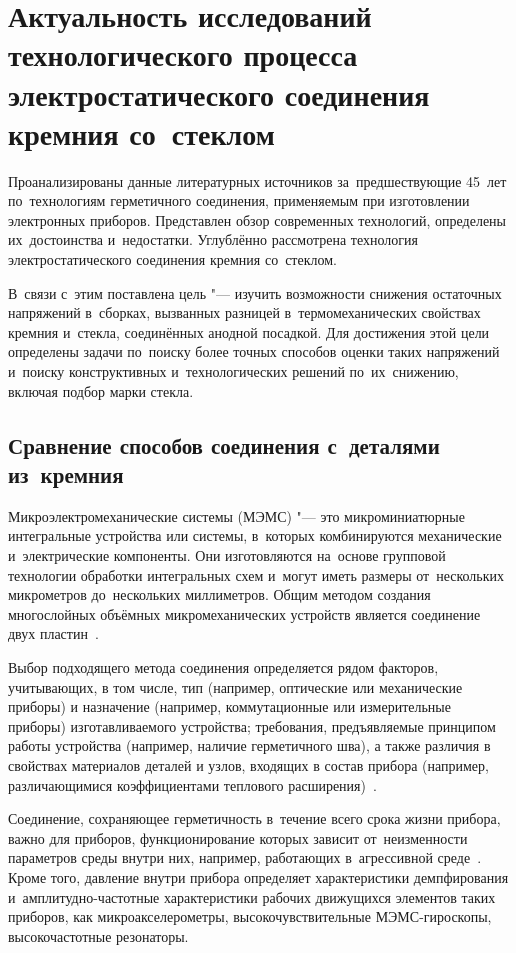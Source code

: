 \chapter{Актуальность исследований технологического процесса электростатического соединения кремния со~стеклом}

Проанализированы данные литературных источников за~предшествующие 45~лет по~технологиям герметичного соединения, применяемым при изготовлении электронных приборов.
Представлен обзор современных технологий, определены их~достоинства и~недостатки. Углублённо рассмотрена технология электростатического соединения кремния со~стеклом.

В~связи с~этим поставлена цель "--- изучить возможности снижения
остаточных напряжений в~сборках, вызванных разницей
в~термомеханических свойствах кремния и~стекла, соединённых анодной
посадкой.  Для достижения этой цели определены задачи по~поиску более
точных способов оценки таких напряжений и~поиску конструктивных
и~технологических решений по~их~снижению, включая подбор марки стекла.

\section{Сравнение способов соединения с~деталями из~кремния}

Микроэлектромеханические системы (МЭМС) "--- это микроминиатюрные интегральные устройства или системы, в~которых комбинируются механические и~электрические компоненты. Они изготовляются на~основе групповой технологии обработки интегральных схем и~могут иметь размеры от~нескольких микрометров до~нескольких миллиметров. Общим методом создания многослойных объёмных микромеханических устройств является соединение двух пластин~\cites[122]{Raspopov_micromechanics2007}.

Выбор подходящего метода соединения определяется рядом факторов, учитывающих, в том числе, тип (например, оптические или механические приборы) и назначение (например, коммутационные или измерительные приборы) изготавливаемого устройства; требования, предъявляемые принципом работы устройства (например, наличие герметичного шва), а также различия в свойствах материалов деталей и узлов, входящих в состав прибора (например, различающимися коэффициентами теплового расширения)~\cite{New_low_temperature_bonding_tech,Vacuum_Packaging_Technology_and_Appl}.

Соединение, сохраняющее герметичность в~течение всего срока жизни прибора, важно для приборов, функционирование которых зависит от~неизменности параметров среды внутри них, например, работающих в~агрессивной среде~\cite{lit_harpster2002long}. Кроме того, давление внутри прибора определяет характеристики демпфирования и~амплитудно-частотные характеристики рабочих движущихся элементов таких приборов, как микроакселерометры, высокочувствительные МЭМС-гироскопы, высокочастотные резонаторы.

